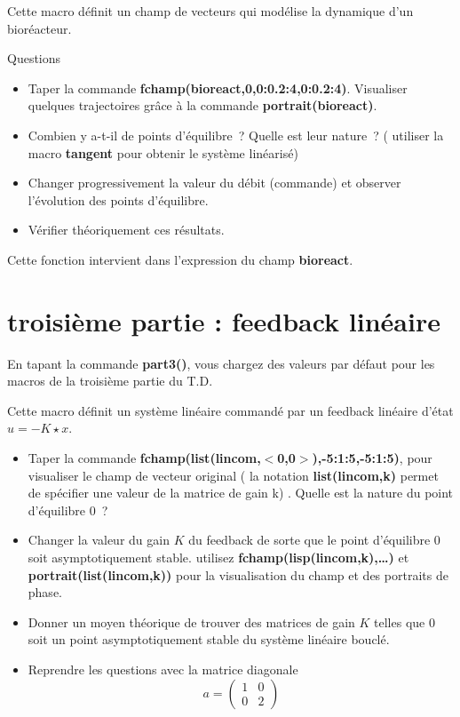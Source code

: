 
Cette macro d\'efinit un champ de vecteurs qui mod\'elise la dynamique
d'un bior\'eacteur.
\medskip

\Mbioreact
\medskip

\centerline{{\sc Questions}}

\begin{itemize}
\item Taper la commande {\bf fchamp(bioreact,0,0:0.2:4,0:0.2:4)}.  
Visualiser quelques trajectoires
gr\^ace \`a la commande {\bf portrait(bioreact)}.
\item Combien y a-t-il de points d'\'equilibre~?
Quelle est leur nature~? ( utiliser la macro {\bf tangent} pour obtenir le 
 syst\`eme lin\'earis\'e)
\item Changer progressivement la valeur du d\'ebit (commande)
et observer l'\'evolution des points d'\'equilibre.
\item V\'erifier th\'eoriquement ces r\'esultats.
\end{itemize}


Cette fonction intervient dans l'expression du champ {\bf bioreact}.
\medskip

\Mmu

\section{troisi\`eme partie : feedback lin\'eaire}


En tapant la commande {\bf part3()}, vous chargez des valeurs par d\'efaut
pour les macros de la troisi\`eme partie du T.D.
\medskip

\Mpartt


Cette macro d\'efinit un syst\`eme lin\'eaire command\'e par
un feedback lin\'eaire d'\'etat $u=-K \star x$.
\medskip

\Mlincom

\begin{itemize}
\item Taper la commande {\bf fchamp(list(lincom,$<$0,0$>$),-5:1:5,-5:1:5)},
 pour visualiser le champ de vecteur original ( la notation {\bf list(lincom,k)} permet de sp\'ecifier une valeur de la matrice de gain k) . 
Quelle est la nature du point d'\'equilibre $0$~?
\item Changer la valeur du gain $K$ du feedback de sorte que le
point d'\'equilibre $0$ soit asymptotiquement stable. utilisez {\bf fchamp(lisp(lincom,k),\ldots)} et {\bf portrait(list(lincom,k))} pour la visualisation du champ et des portraits de phase.
\item Donner un moyen th\'eorique de trouver des matrices de gain
$K$ telles que $0$ soit un point asymptotiquement stable du syst\`eme
 lin\'eaire boucl\'e.
\item Reprendre les questions avec la matrice diagonale 
\[
	a =\left( \begin{array}{cc} 1 & 0 \\ 0 & 2 \end{array} \right)
\]
\end{itemize}


